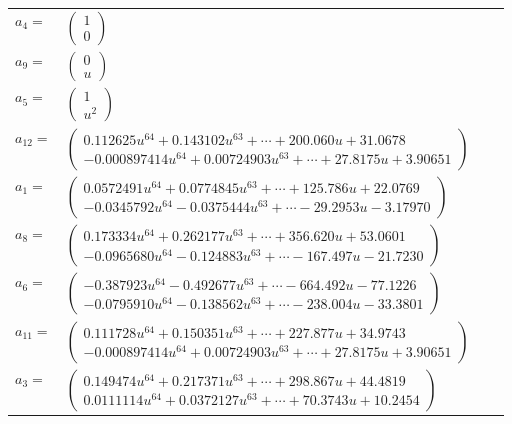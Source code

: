 \documentclass[1p]{elsarticle_modified}
\theoremstyle{definition}
\begin{document}
\begin{tabular}{m{7pt} m{180pt} m{7pt} m{180pt} }
\flushright $a_{4}=$&$\begin{pmatrix}1\\0\end{pmatrix}$ \\
\flushright $a_{9}=$&$\begin{pmatrix}0\\u\end{pmatrix}$ \\
\flushright $a_{5}=$&$\begin{pmatrix}1\\u^2\end{pmatrix}$ \\
\flushright $a_{12}=$&$\begin{pmatrix}0.112625 u^{64}+0.143102 u^{63}+\cdots+200.060 u+31.0678\\-0.000897414 u^{64}+0.00724903 u^{63}+\cdots+27.8175 u+3.90651\end{pmatrix}$ \\
\flushright $a_{1}=$&$\begin{pmatrix}0.0572491 u^{64}+0.0774845 u^{63}+\cdots+125.786 u+22.0769\\-0.0345792 u^{64}-0.0375444 u^{63}+\cdots-29.2953 u-3.17970\end{pmatrix}$ \\
\flushright $a_{8}=$&$\begin{pmatrix}0.173334 u^{64}+0.262177 u^{63}+\cdots+356.620 u+53.0601\\-0.0965680 u^{64}-0.124883 u^{63}+\cdots-167.497 u-21.7230\end{pmatrix}$ \\
\flushright $a_{6}=$&$\begin{pmatrix}-0.387923 u^{64}-0.492677 u^{63}+\cdots-664.492 u-77.1226\\-0.0795910 u^{64}-0.138562 u^{63}+\cdots-238.004 u-33.3801\end{pmatrix}$ \\
\flushright $a_{11}=$&$\begin{pmatrix}0.111728 u^{64}+0.150351 u^{63}+\cdots+227.877 u+34.9743\\-0.000897414 u^{64}+0.00724903 u^{63}+\cdots+27.8175 u+3.90651\end{pmatrix}$ \\
\flushright $a_{3}=$&$\begin{pmatrix}0.149474 u^{64}+0.217371 u^{63}+\cdots+298.867 u+44.4819\\0.0111114 u^{64}+0.0372127 u^{63}+\cdots+70.3743 u+10.2454\end{pmatrix}$ \\

\end{tabular}
\end{document}
